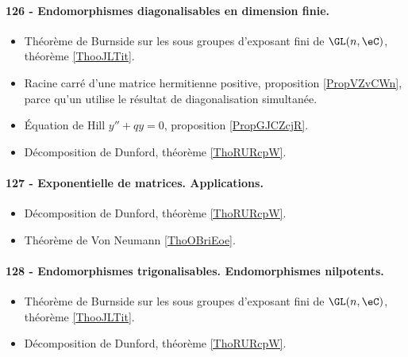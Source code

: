 \paragraph{126 - Endomorphismes diagonalisables en dimension finie.}
\begin{itemize}
    \item Théorème de Burnside sur les sous groupes d'exposant fini de \( \GL(n,\eC)\), théorème \ref{ThooJLTit}.
    \item Racine carré d'une matrice hermitienne positive, proposition \ref{PropVZvCWn}, parce qu'un utilise le résultat de diagonalisation simultanée.
    \item Équation de Hill \( y''+qy=0\), proposition \ref{PropGJCZcjR}.
    \item Décomposition de Dunford, théorème \ref{ThoRURcpW}. 
\end{itemize}
\paragraph{127 - Exponentielle de matrices. Applications.}
\begin{itemize}
    \item Décomposition de Dunford, théorème \ref{ThoRURcpW}.
    \item Théorème de Von Neumann \ref{ThoOBriEoe}.
\end{itemize}
\paragraph{128 - Endomorphismes trigonalisables. Endomorphismes nilpotents.}
\begin{itemize}
    \item Théorème de Burnside sur les sous groupes d'exposant fini de \( \GL(n,\eC)\), théorème \ref{ThooJLTit}.
    \item Décomposition de Dunford, théorème \ref{ThoRURcpW}. 
\end{itemize}
